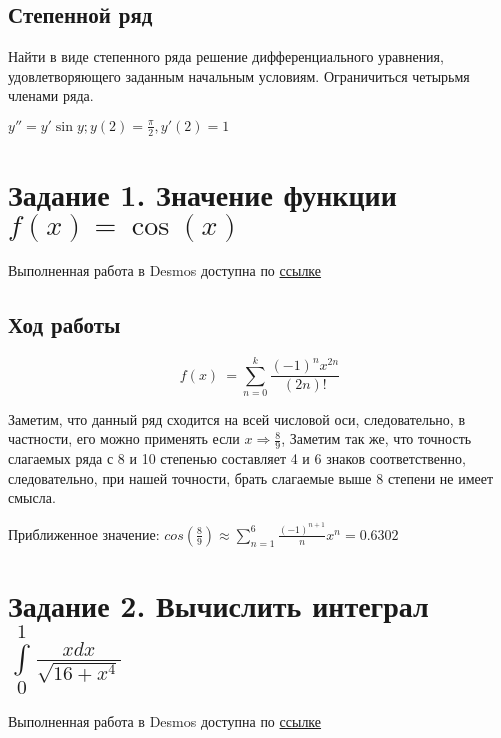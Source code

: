 \documentclass[fleqn]{article}
\renewcommand{\thesubsection}{Задание \arabic{subsection}.}
\begin{document}
\subsection{Степенной ряд}

Найти в виде степенного ряда решение дифференциального уравнения, удовлетворяющего заданным начальным условиям. Ограничиться четырьмя членами ряда. 
\begin{center}
    $y'' = y'\sin{y};   y(2) = \frac{\pi}{2}, y'(2) = 1$
\end{center}

\renewcommand{\thesubsection}{\arabic{subsection}.}


\section{Задание 1. Значение функции $f(x) = \cos(x)$}

Выполненная работа в Desmos доступна по 
\href{https://www.desmos.com/calculator/fvkf5exurh}{ссылке}

\subsection*{Ход работы}

\[
f\left(x\right)\ =\sum_{n=0}^{k}\frac{\left(-1\right)^{n}x^{2n}}{\left(2n\right)!}
\]

Заметим, что данный ряд сходится на всей числовой оси, следовательно, в частности, его можно применять если $x \Rightarrow \frac{8}{9}$, Заметим так же, что точность слагаемых ряда с 8 и 10 степенью составляет 4 и 6 знаков соответственно, следовательно, при нашей точности, брать слагаемые выше 8 степени не имеет смысла.

Приближенное значение: $cos(\frac{8}{9}) \approx \sum_{n=1}^{6}\frac{\left(-1\right)^{n+1}}{n}x^{n} = 0.6302$




\section{Задание 2. Вычислить интеграл $\int\limits_{0}^{1} \frac{xdx}{\sqrt{16+x^4}}$}

Выполненная работа в Desmos доступна по 
\href{https://www.desmos.com/calculator/pv1rt3ixlw}{ссылке}
\end{document}

